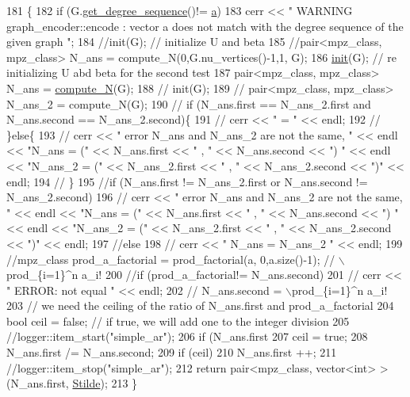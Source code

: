 \begin{DoxyCode}
181                                                                  \{
182   \textcolor{keywordflow}{if} (G.\hyperlink{classgraph_afdca627df7fb93a7d1d8a547f616e948}{get\_degree\_sequence}()!= \hyperlink{classgraph__encoder_a56eb5cf480ae5c2fca9f3a45f2ffd4f1}{a})
183     cerr << \textcolor{stringliteral}{" WARNING graph\_encoder::encode : vector a does not match with the degree sequence of the given
       graph "};
184   \textcolor{comment}{//init(G); // initialize U and beta }
185   \textcolor{comment}{//pair<mpz\_class, mpz\_class> N\_ans  = compute\_N(0,G.nu\_vertices()-1,1, G);}
186   \hyperlink{classgraph__encoder_a6cfb6fca4bc50d4e5d267060a91f43c3}{init}(G); \textcolor{comment}{// re initializing U abd beta for the second test}
187   pair<mpz\_class, mpz\_class> N\_ans = \hyperlink{classgraph__encoder_ad565513b399e97925babdb32d1c914f3}{compute\_N}(G);
188   \textcolor{comment}{// init(G);}
189   \textcolor{comment}{// pair<mpz\_class, mpz\_class> N\_ans\_2 = compute\_N(G);}
190   \textcolor{comment}{// if (N\_ans.first == N\_ans\_2.first and N\_ans.second == N\_ans\_2.second)\{}
191   \textcolor{comment}{//   cerr << " = " << endl;}
192   \textcolor{comment}{// \}else\{}
193   \textcolor{comment}{//   cerr << " error N\_ans and N\_ans\_2 are not the same, "  << endl << "N\_ans = (" << N\_ans.first << " ,
       " << N\_ans.second << ") " << endl << "N\_ans\_2 = (" << N\_ans\_2.first << " , " << N\_ans\_2.second << ")" <<
       endl; }
194   \textcolor{comment}{// \}}
195   \textcolor{comment}{//if (N\_ans.first != N\_ans\_2.first or N\_ans.second != N\_ans\_2.second)}
196   \textcolor{comment}{//  cerr << " error N\_ans and N\_ans\_2 are not the same, "  << endl << "N\_ans = (" << N\_ans.first << " , "
       << N\_ans.second << ") " << endl << "N\_ans\_2 = (" << N\_ans\_2.first << " , " << N\_ans\_2.second << ")" <<
       endl;}
197   \textcolor{comment}{//else}
198   \textcolor{comment}{//  cerr << " N\_ans = N\_ans\_2 " << endl;}
199   \textcolor{comment}{//mpz\_class prod\_a\_factorial = prod\_factorial(a, 0,a.size()-1); // \(\backslash\)prod\_\{i=1\}^n a\_i!}
200   \textcolor{comment}{//if (prod\_a\_factorial!= N\_ans.second)}
201   \textcolor{comment}{//  cerr << " ERROR: not equal " << endl;}
202   \textcolor{comment}{// N\_ans.second = \(\backslash\)prod\_\{i=1\}^n a\_i!}
203   \textcolor{comment}{// we need the ceiling of the ratio of N\_ans.first and prod\_a\_factorial}
204   \textcolor{keywordtype}{bool} ceil = \textcolor{keyword}{false}; \textcolor{comment}{// if true, we will add one to the integer division}
205   \textcolor{comment}{//logger::item\_start("simple\_ar");}
206   \textcolor{keywordflow}{if} (N\_ans.first %
207     ceil = \textcolor{keyword}{true};
208   N\_ans.first /= N\_ans.second;
209   \textcolor{keywordflow}{if} (ceil)
210     N\_ans.first ++;
211   \textcolor{comment}{//logger::item\_stop("simple\_ar");}
212   \textcolor{keywordflow}{return} pair<mpz\_class, vector<int> > (N\_ans.first, \hyperlink{classgraph__encoder_a342688a3fdee511b7fae3f155cfb10cf}{Stilde});
213 \}
\end{DoxyCode}
